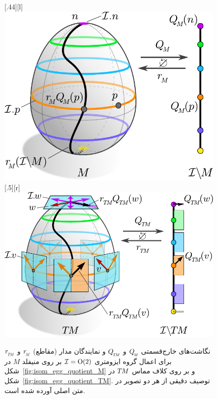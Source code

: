 \begin{figure}
    \centering%
        [.44\linewidth][l]{%
            \includegraphics[width=.43\textwidth]{figures/isometry_egg_quotient_M.pdf}%
            \vspace*{1ex}%
        }%
    \hfill%
        [.5\linewidth][r]{%
            \includegraphics[width=.5\textwidth]{figures/isometry_egg_quotient_TM.pdf}%
            \vspace*{1ex}%
        }%
    \caption{\small%
        نگاشت‌های خارج‌قسمتی $\QM$ و $\QTM$ و نمایندگان مدار (مقاطع) $\rM$ و $\rTM$ برای اعمال گروه ایزومتری $\mathcal{I}=\operatorname{O}(2)$ بر روی منیفلد $M$ در شکل~\ref{fig:isom_egg_quotient_M} و بر روی کلاف مماس $T\mkern-1.5muM$ در شکل~\ref{fig:isom_egg_quotient_TM}.
        توصیف دقیقی از هر دو تصویر در متن اصلی آورده شده است.
    }%
    \label{fig:isom_egg_quotient_main}%
\end{figure}

